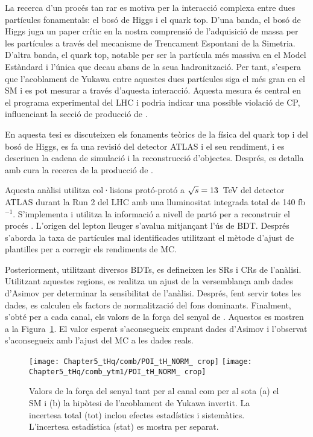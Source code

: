 La recerca d'un procés tan rar es motiva per la interacció complexa entre dues partícules fonamentals: el bosó de Higgs i el quark top. D'una banda, el bosó de Higgs juga un paper crític en la nostra comprensió de l'adquisició de massa per les partícules a través del mecanisme de Trencament Espontani de la Simetria. D'altra banda, el quark top, notable per ser la partícula més massiva en el Model Estàndard i l'única que decau abans de la seua hadronització. Per tant, s'espera que l'acoblament de Yukawa entre aquestes dues partícules siga el més gran en el SM i es pot mesurar a través d'aquesta interacció. Aquesta mesura és central en el programa experimental del LHC i podria indicar una possible violació de CP, influenciant la secció de producció de \tHq.

En aquesta tesi es discuteixen els fonaments teòrics de la física del quark top i del bosó de Higgs, es fa una revisió del detector ATLAS i el seu rendiment, i es descriuen la cadena de simulació i la reconstrucció d'objectes. Després, es detalla amb cura la recerca de la producció de \tHq.

Aquesta anàlisi utilitza col·lisions protó-protó a $\sqrt{s}=13$~TeV del detector ATLAS durant la Run 2 del LHC amb una lluminositat integrada total de 140 fb$^{-1}$. S'implementa i utilitza la informació a nivell de partó per a reconstruir el procés \tHq. L'origen del lepton lleuger s'avalua mitjançant l'ús de BDT. Després s'aborda la taxa de partícules mal identificades utilitzant el mètode d'ajust de plantilles per a corregir els rendiments de MC.

Posteriorment, utilitzant diversos BDTs, es defineixen les SRs i CRs  de l'anàlisi. Utilitzant aquestes regions, es realitza un ajust  de la versemblança amb dades d'Asimov per determinar la sensibilitat de l'anàlisi. Després, fent servir totes les dades, es calculen els factors de normalització del fons dominants. Finalment, s'obté per a cada canal, els valors de la força del senyal de \tHq. Aquestos es mostren a la Figura~\ref{fig:Resum:POIs}. El valor esperat s'aconsegueix emprant dades d'Asimov i l'observat s'aconsegueix amb l'ajust del MC a les dades reals.


\begin{figure}[h] 
\centering
  \texttt{[image: Chapter5\_tHq/comb/POI\_tH\_NORM\_ crop]}
  \texttt{[image: Chapter5\_tHq/comb\_ytm1/POI\_tH\_NORM\_ crop]}\caption{Valors de la força del senyal tant per al canal \dilepOStau com per al \dilepSStau sota (a) el SM i (b) la hipòtesi de l'acoblament de Yukawa invertit. La incertesa total (tot) inclou efectes estadístics i sistemàtics. L'incertesa estadística (stat) es mostra per separat. }
\label{fig:Resum:POIs}
\end{figure}


